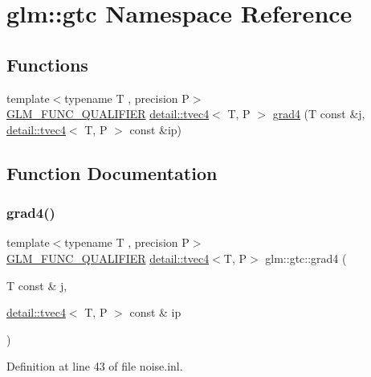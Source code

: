 \hypertarget{namespaceglm_1_1gtc}{}\section{glm\+:\+:gtc Namespace Reference}
\label{namespaceglm_1_1gtc}
\subsection*{Functions}
\begin{DoxyCompactItemize}
\item 
{\footnotesize template$<$typename T , precision P$>$ }\\\hyperlink{setup_8hpp_a33fdea6f91c5f834105f7415e2a64407}{G\+L\+M\+\_\+\+F\+U\+N\+C\+\_\+\+Q\+U\+A\+L\+I\+F\+I\+ER} \hyperlink{structglm_1_1detail_1_1tvec4}{detail\+::tvec4}$<$ T, P $>$ \hyperlink{namespaceglm_1_1gtc_a60a628dac031a1bafeead87b20b1b641}{grad4} (T const \&j, \hyperlink{structglm_1_1detail_1_1tvec4}{detail\+::tvec4}$<$ T, P $>$ const \&ip)
\end{DoxyCompactItemize}


\subsection{Function Documentation}
\mbox{\label{namespaceglm_1_1gtc_a60a628dac031a1bafeead87b20b1b641}} 
\subsubsection{\texorpdfstring{grad4()}{grad4()}}
{\footnotesize\ttfamily template$<$typename T , precision P$>$ \\
\hyperlink{setup_8hpp_a33fdea6f91c5f834105f7415e2a64407}{G\+L\+M\+\_\+\+F\+U\+N\+C\+\_\+\+Q\+U\+A\+L\+I\+F\+I\+ER} \hyperlink{structglm_1_1detail_1_1tvec4}{detail\+::tvec4}$<$T, P$>$ glm\+::gtc\+::grad4 (\begin{DoxyParamCaption}\item[{T const \&}]{j,  }\item[{\hyperlink{structglm_1_1detail_1_1tvec4}{detail\+::tvec4}$<$ T, P $>$ const \&}]{ip }\end{DoxyParamCaption})}



Definition at line 43 of file noise.\+inl.

